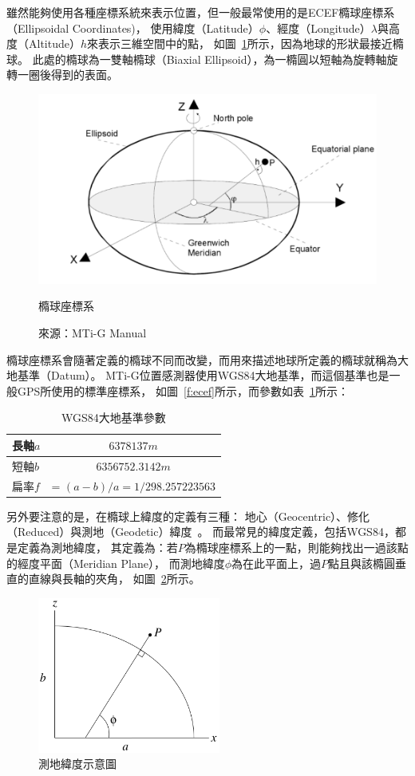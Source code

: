 雖然能夠使用各種座標系統來表示位置，但一般最常使用的是ECEF橢球座標系（Ellipsoidal Coordinates)，
使用緯度（Latitude）$\phi$、經度（Longitude）$\lambda$與高度（Altitude）$h$來表示三維空間中的點，
如圖~\ref{f:ellipsoid}所示，因為地球的形狀最接近橢球。
此處的橢球為一雙軸橢球（Biaxial Ellipsoid），為一橢圓以短軸為旋轉軸旋轉一圈後得到的表面。
\begin{figure}[h!]
	\centering
	\includegraphics[width=12cm]{figures/ellipsoid}
	\caption{橢球座標系}
	\caption*{來源：MTi-G Manual}
	\label{f:ellipsoid}
\end{figure}

橢球座標系會隨著定義的橢球不同而改變，而用來描述地球所定義的橢球就稱為大地基準（Datum）。
MTi-G位置感測器使用WGS84大地基準，而這個基準也是一般GPS所使用的標準座標系，
如圖~\ref{f:ecef}所示，而參數如表~\ref{t:wgs84}所示：
\begin{table}[h!]
	\centering
	\caption{WGS84大地基準參數}
	\label{t:wgs84}
	\begin{tabular}{ | l | c | }
		\hline
		長軸$a$ & $6378137m$ \\ \hline
		短軸$b$ & $6356752.3142m$ \\ \hline
		扁率$f$	& = $(a-b) / a = 1/298.257223563$ \\
		\hline
	\end{tabular}
\end{table}

另外要注意的是，在橢球上緯度的定義有三種：
地心（Geocentric）、修化（Reduced）與測地（Geodetic）緯度~\cite{Jekeli:2006:GRSinGeodesy}。
而最常見的緯度定義，包括WGS84，都是定義為測地緯度，
其定義為：若$P$為橢球座標系上的一點，則能夠找出一過該點的經度平面（Meridian Plane），
而測地緯度$\phi$為在此平面上，過$P$點且與該橢圓垂直的直線與長軸的夾角，
如圖~\ref{f:geodetic_latitude}所示。
\begin{figure}[h!]
	\centering
	\includegraphics[width=6cm]{figures/geodetic_latitude}
	\caption{測地緯度示意圖}
	\label{f:geodetic_latitude}
\end{figure}

